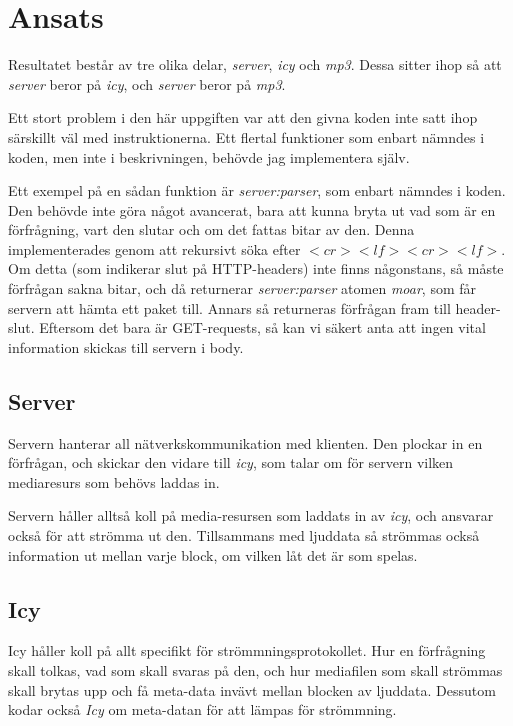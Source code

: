 \documentclass[a4paper, 11pt]{article}
\begin{document}
\section{Ansats}

Resultatet består av tre olika delar, \emph{server}, \emph{icy} och \emph{mp3}. Dessa sitter ihop så att \emph{server} beror på \emph{icy}, och \emph{server} beror på \emph{mp3}.

Ett stort problem i den här uppgiften var att den givna koden inte satt ihop särskillt väl med instruktionerna. Ett flertal funktioner som enbart nämndes i koden, men inte i beskrivningen, behövde jag implementera själv.

Ett exempel på en sådan funktion är \emph{server:parser}, som enbart nämndes i koden. Den behövde inte göra något avancerat, bara att kunna bryta ut vad som är en förfrågning, vart den slutar och om det fattas bitar av den. Denna implementerades genom att rekursivt söka efter $<cr><lf><cr><lf>$. Om detta (som indikerar slut på HTTP-headers) inte finns någonstans, så måste
förfrågan sakna bitar, och då returnerar \emph{server:parser} atomen \emph{moar}, som får servern att hämta ett paket till. Annars så returneras förfrågan fram till header-slut.
Eftersom det bara är GET-requests, så kan vi säkert anta att ingen vital information skickas till servern i body.

\subsection{Server}

Servern hanterar all nätverkskommunikation med klienten. Den plockar in en förfrågan, och skickar den vidare till \emph{icy}, som talar om för servern vilken mediaresurs som behövs laddas in.

Servern håller alltså koll på media-resursen som laddats in av \emph{icy}, och ansvarar också för att strömma ut den. Tillsammans med ljuddata så strömmas också information ut mellan varje block, om vilken låt det är som spelas.

\subsection{Icy}

Icy håller koll på allt specifikt för strömmningsprotokollet. Hur en förfrågning skall tolkas, vad som skall svaras på den, och hur mediafilen som skall strömmas skall brytas upp och få meta-data invävt mellan blocken av ljuddata. Dessutom kodar också \emph{Icy} om meta-datan för att lämpas för strömmning.
\end{document}
